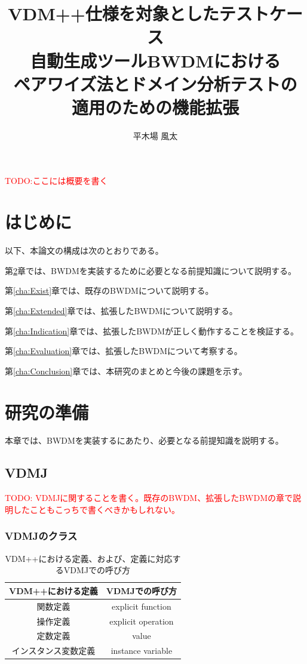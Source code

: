 \documentclass[uplatex, report, a4j, 10pt]{jsbook}
\title{VDM++仕様を対象としたテストケース \\ 自動生成ツールBWDMにおける \\ ペアワイズ法とドメイン分析テストの \\ 適用のための機能拡張}
\author{平木場 風太}
\newcommand\todo[1]{\textcolor{red}{#1}}
\newcommand{\tool}{BWDM}
\begin{document}
\maketitle


\todo{TODO:ここには概要を書く}


%
\chapter{はじめに}\label{cha:Introduction}

以下、本論文の構成は次のとおりである。

第\ref{cha:Preparation}章では、\tool{}を実装するために必要となる前提知識について説明する。

第\ref{cha:Exist}章では、既存の\tool{}について説明する。

第\ref{cha:Extended}章では、拡張した\tool{}について説明する。

第\ref{cha:Indication}章では、拡張した\tool{}が正しく動作することを検証する。

第\ref{cha:Evaluation}章では、拡張した\tool{}について考察する。

第\ref{cha:Conclusion}章では、本研究のまとめと今後の課題を示す。



\chapter{研究の準備}\label{cha:Preparation}

本章では、\tool{}を実装するにあたり、必要となる前提知識を説明する。

\section{VDMJ}\label{cha:vdmj}
\todo{TODO: VDMJに関することを書く。既存のBWDM、拡張したBWDMの章で説明したこともこっちで書くべきかもしれない。}

\subsection{VDMJのクラス}
\begin{table}[t]
  \begin{center}
    \caption{VDM++における定義、および、定義に対応するVDMJでの呼び方}
    \label{tab:vdmj_definition_name}
    \begin{tabular}{c|c}
      VDM++における定義    & VDMJでの呼び方     \\
      \hline
      \hline
      関数定義             & explicit function  \\ \hline
      操作定義             & explicit operation \\ \hline
      定数定義             & value              \\ \hline
      インスタンス変数定義 & instance variable
    \end{tabular}
  \end{center}
\end{table}
\end{document}
